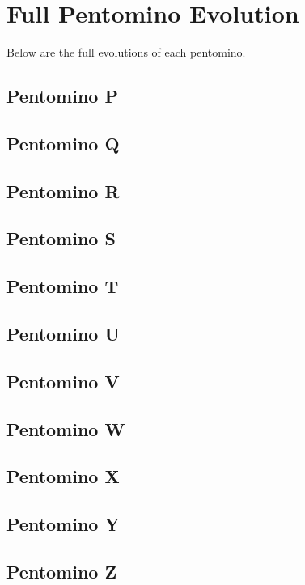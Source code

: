 
\section{Full Pentomino Evolution}
\label{appendix:main-app}

Below are the full evolutions of each pentomino.

\subsection{Pentomino P}
\subsection{Pentomino Q}
\subsection{Pentomino R}
\subsection{Pentomino S}
\subsection{Pentomino T}
\subsection{Pentomino U}
\subsection{Pentomino V}
\subsection{Pentomino W}
\subsection{Pentomino X}
\subsection{Pentomino Y}
\subsection{Pentomino Z}
